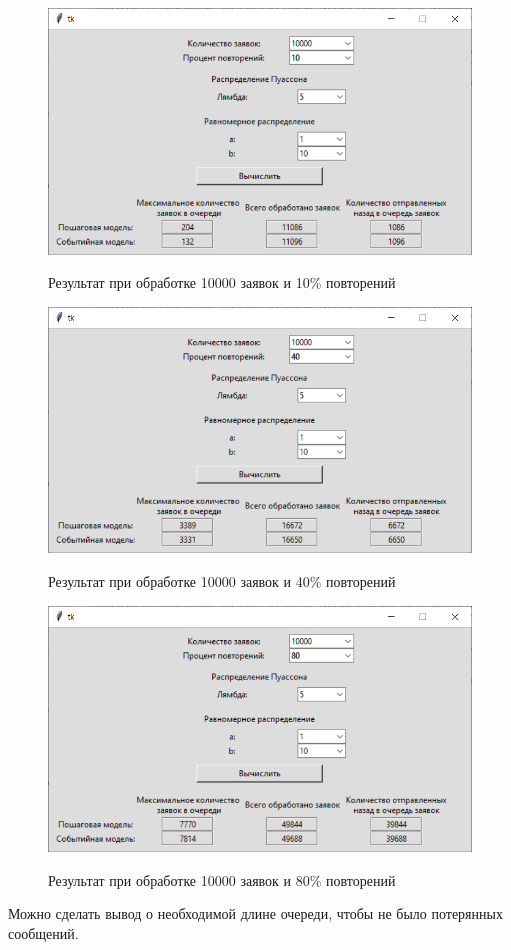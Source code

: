 \documentclass[12pt,a4paper,oneside]{report}
\begin{document}
\begin{figure}[!h]
	\centering
	\includegraphics[scale=0.7]{3_2.png}
	\label{fig:screenshot010}
	\caption{Результат при обработке 10000 заявок и 10\% повторений}
\end{figure}
\clearpage

\begin{figure}[!h]
	\centering
	\includegraphics[scale=0.7]{3_3.png}
	\label{fig:screenshot011}
	\caption{Результат при обработке 10000 заявок и 40\% повторений}
\end{figure}

\begin{figure}[!h]
	\centering
	\includegraphics[scale=0.7]{3_4.png}
	\label{fig:screenshot012}
	\caption{Результат при обработке 10000 заявок и 80\% повторений}
\end{figure}

Можно сделать вывод о необходимой длине очереди, чтобы не было потерянных сообщений.
\end{document}
